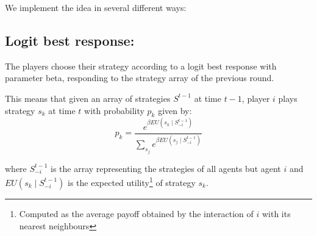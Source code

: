 \documentclass{article}
\begin{document}
We implement the idea in several different ways:

\subsection{Logit best response:}
The players choose their strategy according to a logit best response with parameter beta, responding to the strategy array of the previous round.

This means that given an array of strategies $S^{t-1}$ at time $t-1$, player $i$ plays strategy $s_k$ at time $t$ with probability $p_k$ given by:
$$
p_{k}=\frac{e^{\beta EU\left(s_{k}\mid S_{-i}^{t-1}\right)}}{\sum_{s_{j}}e^{\beta EU\left(s_{j}\mid S_{-i}^{t-1}\right)}}
$$

where $ S_{-i}^{t-1}$ is the array representing the strategies of all agents but agent $i$
and $EU\left(s_{k}\mid S_{-i}^{t-1}\right)$ is the expected utility\footnote{Computed as the average payoff obtained by the interaction of $i$ with its nearest neighbours} of strategy $s_k$.
\end{document}
